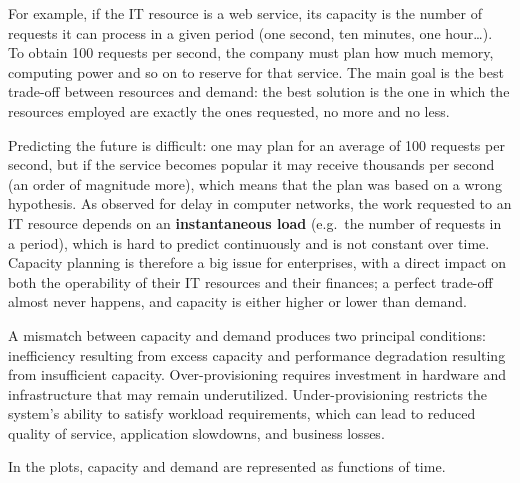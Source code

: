 For example, if the IT resource is a web service, its capacity is the number of requests it can process in a given period (one second, ten minutes, one hour\ldots). To obtain 100 requests per second, the company must plan how much memory, computing power and so on to reserve for that service. The main goal is the best trade-off between resources and demand: the best solution is the one in which the resources employed are exactly the ones requested, no more and no less.

Predicting the future is difficult: one may plan for an average of 100 requests per second, but if the service becomes popular it may receive thousands per second (an order of magnitude more), which means that the plan was based on a wrong hypothesis. As observed for delay in computer networks, the work requested to an IT resource depends on an \textbf{instantaneous load} (e.g.\ the number of requests in a period), which is hard to predict continuously and is not constant over time. Capacity planning is therefore a big issue for enterprises, with a direct impact on both the operability of their IT resources and their finances; a perfect trade-off almost never happens, and capacity is either higher or lower than demand.

A mismatch between capacity and demand produces two principal conditions: inefficiency resulting from excess capacity and performance degradation resulting from insufficient capacity. Over-provisioning requires investment in hardware and infrastructure that may remain underutilized. Under-provisioning restricts the system's ability to satisfy workload requirements, which can lead to reduced quality of service, application slowdowns, and business losses.

\begin{center}
\end{center}

In the plots, capacity and demand are represented as functions of time.

